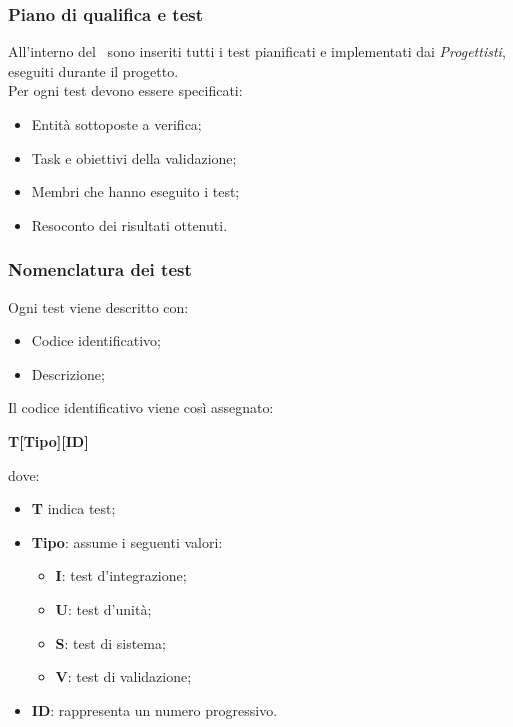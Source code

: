 \subsubsection{Piano di qualifica e test}
All'interno del \PdQ\ sono inseriti tutti i test pianificati e implementati dai \textit{Progettisti}, eseguiti durante il progetto.\\
Per ogni test devono essere specificati:
\begin{itemize}
	\item Entità sottoposte a verifica;
	\item Task e obiettivi della validazione;
	\item Membri che hanno eseguito i test;
	\item Resoconto dei risultati ottenuti.
\end{itemize}

\subsubsection{Nomenclatura dei test}
Ogni test viene descritto con:
\begin{itemize}
	\item Codice identificativo;
	\item Descrizione;
\end{itemize}
Il codice identificativo viene così assegnato:
\begin{center}
	\textbf{T[Tipo][ID]}
\end{center}
dove:
\begin{itemize}
	\item \textbf{T} indica test;
	\item\textbf{Tipo}: assume i seguenti valori:
	\begin{itemize}
		\item \textbf{I}: test d'integrazione;
		\item \textbf{U}: test d'unità;
		\item \textbf{S}: test di sistema;
		\item \textbf{V}: test di validazione;
	\end{itemize}
	\item \textbf{ID}: rappresenta un numero progressivo.
\end{itemize}